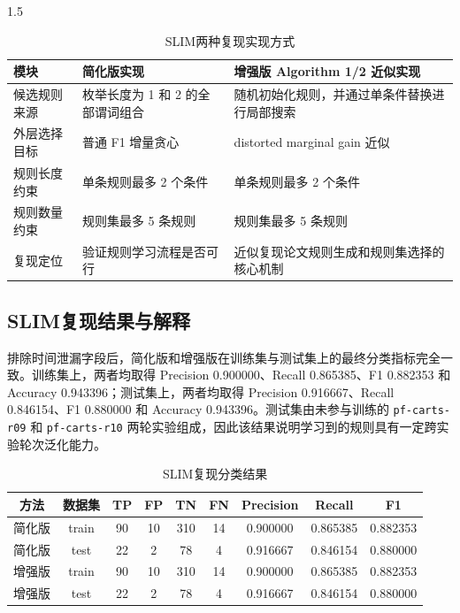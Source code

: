 \documentclass[a4paper,12pt]{report}
\begin{document}
\begin{spacing}{1.5}
\begin{table}[H]
\centering
\caption{SLIM两种复现实现方式}
\begin{tabular}{p{3.2cm}p{4.8cm}p{5.2cm}}
\toprule
\textbf{模块} & \textbf{简化版实现} & \textbf{增强版 Algorithm 1/2 近似实现} \\
\midrule
候选规则来源 & 枚举长度为 1 和 2 的全部谓词组合 & 随机初始化规则，并通过单条件替换进行局部搜索 \\
外层选择目标 & 普通 F1 增量贪心 & distorted marginal gain 近似 \\
规则长度约束 & 单条规则最多 2 个条件 & 单条规则最多 2 个条件 \\
规则数量约束 & 规则集最多 5 条规则 & 规则集最多 5 条规则 \\
复现定位 & 验证规则学习流程是否可行 & 近似复现论文规则生成和规则集选择的核心机制 \\
\bottomrule
\end{tabular}
\end{table}

\subsection{SLIM复现结果与解释}

排除时间泄漏字段后，简化版和增强版在训练集与测试集上的最终分类指标完全一致。训练集上，两者均取得 Precision 0.900000、Recall 0.865385、F1 0.882353 和 Accuracy 0.943396；测试集上，两者均取得 Precision 0.916667、Recall 0.846154、F1 0.880000 和 Accuracy 0.943396。测试集由未参与训练的 \texttt{pf-carts-r09} 和 \texttt{pf-carts-r10} 两轮实验组成，因此该结果说明学习到的规则具有一定跨实验轮次泛化能力。

\begin{table}[H]
\centering
\caption{SLIM复现分类结果}
\begin{tabular}{ccccccccc}
\toprule
\textbf{方法} & \textbf{数据集} & \textbf{TP} & \textbf{FP} & \textbf{TN} & \textbf{FN} & \textbf{Precision} & \textbf{Recall} & \textbf{F1} \\
\midrule
简化版 & train & 90 & 10 & 310 & 14 & 0.900000 & 0.865385 & 0.882353 \\
简化版 & test & 22 & 2 & 78 & 4 & 0.916667 & 0.846154 & 0.880000 \\
增强版 & train & 90 & 10 & 310 & 14 & 0.900000 & 0.865385 & 0.882353 \\
增强版 & test & 22 & 2 & 78 & 4 & 0.916667 & 0.846154 & 0.880000 \\
\bottomrule
\end{tabular}
\end{table}


\end{spacing}
\end{document}
